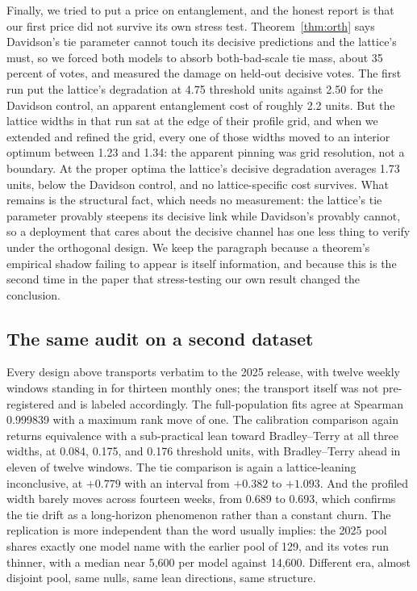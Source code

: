 \documentclass[10pt]{article}
\begin{document}
Finally, we tried to put a price on entanglement, and the honest
report is that our first price did not survive its own stress test.
Theorem~\ref{thm:orth} says Davidson's tie parameter cannot touch its
decisive predictions and the lattice's must, so we forced both models
to absorb both-bad-scale tie mass, about 35 percent of votes, and
measured the damage on held-out decisive votes. The first run put the
lattice's degradation at 4.75 threshold units against 2.50 for the
Davidson control, an apparent entanglement cost of roughly 2.2 units.
But the lattice widths in that run sat at the edge of their profile
grid, and when we extended and refined the grid, every one of those
widths moved to an interior optimum between 1.23 and 1.34: the
apparent pinning was grid resolution, not a boundary. At the proper
optima the lattice's decisive degradation averages 1.73 units, below
the Davidson control, and no lattice-specific cost survives. What
remains is the structural fact, which needs no measurement: the
lattice's tie parameter provably steepens its decisive link while
Davidson's provably cannot, so a deployment that cares about the
decisive channel has one less thing to verify under the orthogonal
design. We keep the paragraph because a theorem's empirical shadow
failing to appear is itself information, and because this is the
second time in the paper that stress-testing our own result changed
the conclusion.

\subsection{The same audit on a second dataset}\label{sec:repl}

Every design above transports verbatim to the 2025 release, with
twelve weekly windows standing in for thirteen monthly ones; the
transport itself was not pre-registered and is labeled accordingly.
The full-population fits agree at Spearman 0.999839 with a maximum
rank move of one. The calibration comparison again returns
equivalence with a sub-practical lean toward Bradley--Terry at all
three widths, at 0.084, 0.175, and 0.176 threshold units, with
Bradley--Terry ahead in eleven of twelve windows. The tie comparison
is again a lattice-leaning inconclusive, at $+0.779$ with an
interval from $+0.382$ to $+1.093$. And the profiled width barely
moves across fourteen weeks, from 0.689 to 0.693, which confirms the
tie drift as a long-horizon phenomenon rather than a constant churn.
The replication is more independent than the word usually implies:
the 2025 pool shares exactly one model name with the earlier pool of
129, and its votes run thinner, with a median near 5,600 per model
against 14,600. Different era, almost disjoint pool, same nulls, same
lean directions, same structure.
\end{document}
